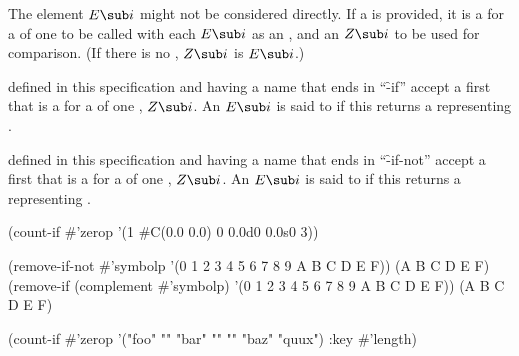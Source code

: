 The element $E\sub i$ might not be considered directly.
If a   is provided,
it is a  for a  of one  
to be called with each $E\sub i$ as an , 
and  an  $Z\sub i$ to be used for comparison.
(If there is no  , $Z\sub i$ is $E\sub i$.)

 defined in this specification and having a name that
ends in ``\f{-if}'' accept a first  that is a  for a 
 of one , $Z\sub i$.
An $E\sub i$ is said to  if this  
returns a  representing .

 defined in this specification and having a name that
ends in ``\f{-if-not}'' accept a first  that is a  for a 
 of one , $Z\sub i$.
An $E\sub i$ is said to  if this  
returns a  representing .


\code
 (count-if #'zerop '(1 #C(0.0 0.0) 0 0.0d0 0.0s0 3)) 

 (remove-if-not #'symbolp '(0 1 2 3 4 5 6 7 8 9 A B C D E F))
\EV (A B C D E F)
 (remove-if (complement #'symbolp) '(0 1 2 3 4 5 6 7 8 9 A B C D E F))
\EV (A B C D E F)

 (count-if #'zerop '("foo" "" "bar" "" "" "baz" "quux") :key #'length)
\endcode

\endsubsubsection%

\endsubsection%
